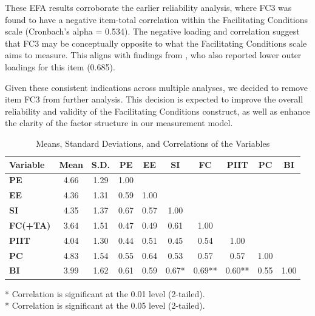 \documentclass[twocolumn]{article}
\begin{document}
These EFA results corroborate the earlier reliability analysis, where FC3 was found to have a negative item-total correlation within the Facilitating Conditions scale (Cronbach's alpha = 0.534). The negative loading and correlation suggest that FC3 may be conceptually opposite to what the Facilitating Conditions scale aims to measure. This aligns with findings from \textcite{queiroz_blockchain_2019}, who also reported lower outer loadings for this item (0.685). 

Given these consistent indications across multiple analyses, we decided to remove item FC3 from further analysis. This decision is expected to improve the overall reliability and validity of the Facilitating Conditions construct, as well as enhance the clarity of the factor structure in our measurement model.

\begin{table}[ht]
\centering
\caption{Means, Standard Deviations, and Correlations of the Variables}
\label{tab:correlation_matrix}
\begin{tabular}{lccccccccc}
\toprule
\textbf{Variable} & \textbf{Mean} & \textbf{S.D.} & \textbf{PE} & \textbf{EE} & \textbf{SI} & \textbf{FC} & \textbf{PIIT} & \textbf{PC} & \textbf{BI} \\
\midrule
\textbf{PE}   & 4.66 & 1.29 & 1.00 &       &       &       &       &       \\
\textbf{EE}   & 4.36 & 1.31 & 0.59 & 1.00  &       &       &       &       \\
\textbf{SI}   & 4.35 & 1.37 & 0.67 & 0.57  & 1.00  &       &       &       \\
\textbf{FC(+TA)}   & 3.64 & 1.51 & 0.47 & 0.49  & 0.61  & 1.00  &       &       \\
\textbf{PIIT} & 4.04 & 1.30 & 0.44 & 0.51  & 0.45  & 0.54  & 1.00  &       \\
\textbf{PC}   & 4.83 & 1.54 & 0.55 & 0.64  & 0.53  & 0.57  & 0.57  & 1.00  \\
\textbf{BI}   & 3.99 & 1.62 & 0.61 & 0.59  & 0.67* & 0.69** & 0.60** & 0.55  & 1.00 \\
\bottomrule
\end{tabular}
\smallskip
\begin{flushleft}
\footnotesize \centering ** Correlation is significant at the 0.01 level (2-tailed). \\
* Correlation is significant at the 0.05 level (2-tailed).
\end{flushleft}
\end{table}
\end{document}
